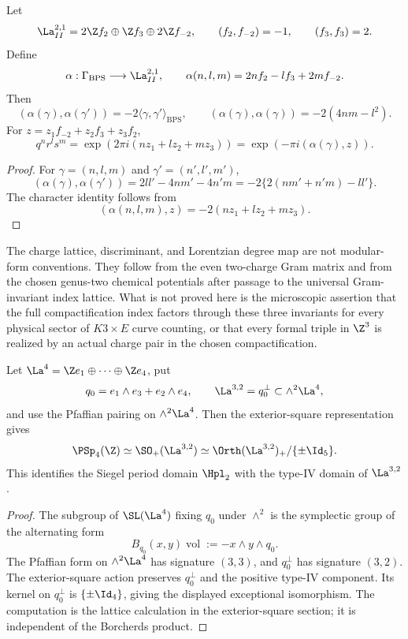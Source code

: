\begin{proposition}
Let
$$
\La^{2,1}_{II}=2\Z f_2\oplus\Z f_3\oplus 2\Z f_{-2},
\qquad
(f_2,f_{-2})=-1,\qquad (f_3,f_3)=2.
$$
Define
$$
\alpha:\Gamma_{\mathrm{BPS}}\longrightarrow\La^{2,1}_{II},
\qquad
\alpha(n,l,m)=2nf_2-lf_3+2mf_{-2}.
$$
Then
$$
(\alpha(\gamma),\alpha(\gamma'))
=-2\langle\gamma,\gamma'\rangle_{\mathrm{BPS}},
\qquad
(\alpha(\gamma),\alpha(\gamma))=-2(4nm-l^2).
$$
For $z=z_1f_{-2}+z_2f_3+z_3f_2$,
$$
q^nr^ls^m
=\exp(2\pi i(nz_1+lz_2+mz_3))
=\exp(-\pi i(\alpha(\gamma),z)).
$$
\end{proposition}

\begin{proof}
For $\gamma=(n,l,m)$ and $\gamma'=(n',l',m')$,
$$
(\alpha(\gamma),\alpha(\gamma'))
=2ll'-4nm'-4n'm
=-2\{2(nm'+n'm)-ll'\}.
$$
The character identity follows from
$$
(\alpha(n,l,m),z)=-2(nz_1+lz_2+mz_3).
$$
\end{proof}

\begin{remark}
The charge lattice, discriminant, and Lorentzian degree map are not
modular-form conventions.  They follow from the even two-charge Gram
matrix and from the chosen genus-two chemical potentials after passage
to the universal Gram-invariant index lattice.  What is not proved here
is the microscopic assertion that the full compactification index
factors through these three invariants for every physical sector of
$K3\times E$ curve counting, or that every formal triple in $\Z^3$ is
realized by an actual charge pair in the chosen compactification.
\end{remark}

\begin{proposition}
Let $\La^4=\Z e_1\oplus\cdots\oplus\Z e_4$, put
$$
q_0=e_1\wedge e_3+e_2\wedge e_4,
\qquad
\La^{3,2}=q_0^\perp\subset\wedge^2\La^4,
$$
and use the Pfaffian pairing on $\wedge^2\La^4$.  Then the
exterior-square representation gives
$$
\PSp_4(\Z)\simeq\SO_+(\La^{3,2})
\simeq\Orth(\La^{3,2})_+/\{\pm\Id_5\}.
$$
This identifies the Siegel period domain $\Hpl_2$ with the type-IV
domain of $\La^{3,2}$.
\end{proposition}

\begin{proof}
The subgroup of $\SL(\La^4)$ fixing $q_0$ under $\wedge^2$ is the
symplectic group of the alternating form
$$
B_{q_0}(x,y)\operatorname{vol}:=-x\wedge y\wedge q_0.
$$
The Pfaffian form on $\wedge^2\La^4$ has signature $(3,3)$, and
$q_0^\perp$ has signature $(3,2)$.  The exterior-square action preserves
$q_0^\perp$ and the positive type-IV component.  Its kernel on
$q_0^\perp$ is $\{\pm\Id_4\}$, giving the displayed exceptional
isomorphism.  The computation is the lattice calculation in the
exterior-square section; it is independent of the Borcherds product.
\end{proof}

